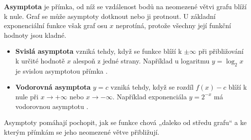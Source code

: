 \documentclass[12pt,a4paper]{article}
\begin{document}
\begin{notebox}
\textbf{Asymptota} je přímka, od níž se vzdálenost bodů na neomezené větvi grafu blíží k nule.
Graf se může asymptoty dotknout nebo ji protnout.
U základní exponenciální funkce však graf osu $x$ neprotíná,
protože všechny její funkční hodnoty jsou kladné.

\begin{itemize}
    \item \textbf{Svislá asymptota} vzniká tehdy, když se funkce blíží k $\pm\infty$ 
    při přibližování k určité hodnotě $x$ alespoň z jedné strany.  
    Například u logaritmu $y = \log_2 x$ je svislou asymptotou přímka .

    \item \textbf{Vodorovná asymptota} $y=c$ vzniká tehdy, když se rozdíl $f(x)-c$
    blíží k nule při $x\to+\infty$ nebo $x\to-\infty$.  
    Například exponenciála $y = 2^{-x}$ má vodorovnou asymptotu .
\end{itemize}

Asymptoty pomáhají pochopit, jak se funkce chová „daleko od středu grafu“ 
a ke kterým přímkám se jeho neomezené větve přibližují.
\end{notebox}
\end{document}
